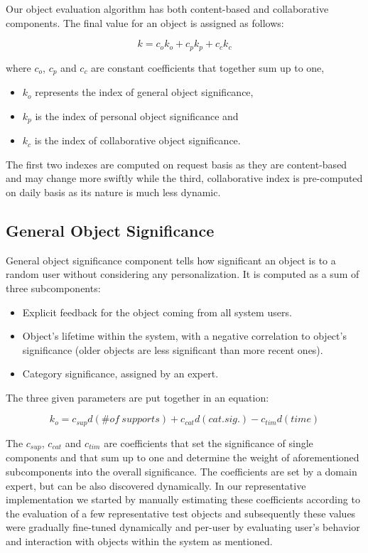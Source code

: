 \documentclass[6pt]{article}
\begin{document}
Our object evaluation algorithm has both content-based and collaborative components. 
The final value for an object is assigned as follows:
 
$$k=c_ok_o+c_pk_p+c_ck_c $$

where $c_o$, $c_p$ and $c_c$ are constant coefficients that together sum up to one,
\begin{itemize}
\item $k_o$ represents the index of general object significance,
\item $k_p$ is the index of personal object significance and
\item $k_c$ is the index of collaborative object significance.
\end{itemize}

The first two indexes are computed on request basis as they are content-based and may change more swiftly while the third, collaborative index is pre-computed on daily basis as its nature is much less dynamic.

\subsection{General Object Significance}

General object significance component tells how significant an object is to a random user without considering any personalization. It is computed as a sum of three subcomponents:

\begin{itemize}
\item Explicit feedback for the object coming from all system users.
\item Object's lifetime within the system, with a negative correlation to object's significance (older objects are less significant than more recent ones).
\item Category significance, assigned by an expert.
\end{itemize}

The three given parameters are put together in an equation:

$$k_o=c_{sup}d(\#of~supports)+c_{cat}d(cat.sig.)-c_{tim}d(time)$$

The $c_{sup}$, $c_{cat}$ and $c_{tim}$ are coefficients that set the significance of single components and that sum up to one and determine the weight of aforementioned subcomponents into the overall significance. The coefficients are set by a domain expert, but can be also discovered dynamically. In our representative implementation we started by manually estimating these coefficients according to the evaluation of a few representative test objects and subsequently these values were gradually fine-tuned dynamically and per-user by evaluating user’s behavior and interaction with objects within the system as mentioned.
\end{document}
